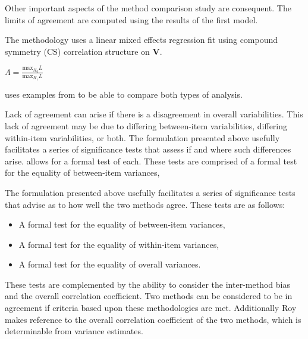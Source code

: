 \documentclass[12pt, a4paper]{report}
\theoremstyle{plain}
\theoremstyle{definition}
\theoremstyle{remark}
\begin{document}
	Other important aspects of the method comparison study are consequent. The limits of agreement are computed using the results of the first model.
	
	
	
	
	The methodology uses a linear mixed effects regression fit using
	compound symmetry (CS) correlation structure on \textbf{V}.
	
	
	$\Lambda = \frac{\mbox{max}_{H_{0}}L}{\mbox{max}_{H_{1}}L}$
	
	
	
	\citet{ARoy2009} uses examples from \citet{BA86} to be able to
	compare both types of analysis.
	
	
	\newpage		
	Lack of agreement can arise if there is a disagreement in overall variabilities. This lack of agreement may be due to differing between-item variabilities, differing within-item variabilities, or both. The formulation presented above usefully facilitates a series of significance tests that assess if and where such differences arise. \citet{ARoy2009} allows for a formal test of each. These tests are comprised of a formal test for the equality of between-item variances,
	
	The formulation presented above usefully facilitates a series of significance tests that advise as to how well the two methods
	agree. These tests are as follows:
	\begin{itemize}
		\item A formal test for the equality of between-item variances,
		\item A formal test for the equality of within-item variances,
		\item A formal test for the equality of overall variances.
	\end{itemize}
	These tests are complemented by the ability to consider the inter-method bias and the overall correlation coefficient. Two methods can be considered to be in agreement if criteria based upon these methodologies are met. Additionally Roy makes reference to the overall correlation coefficient of the two methods, which is determinable from variance estimates.
	

	
	

	
	
	
	
	
\end{document}
